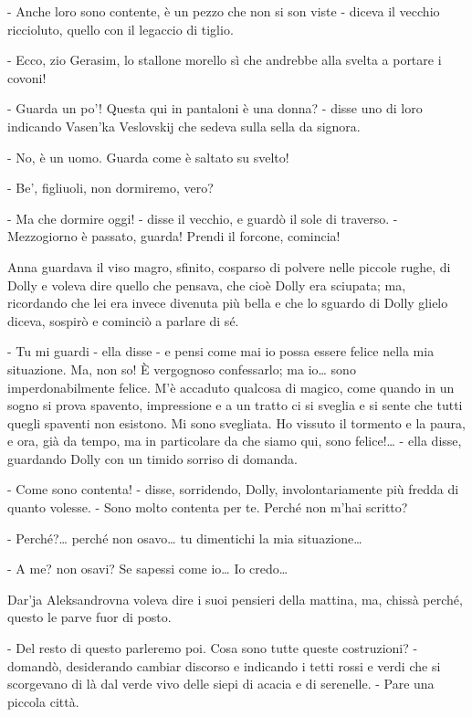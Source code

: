 - Anche loro sono contente, è un pezzo che non si son viste - diceva il vecchio riccioluto, quello con il legaccio di tiglio. 

- Ecco, zio Gerasim, lo stallone morello sì che andrebbe alla svelta a portare i covoni! 

- Guarda un po'! Questa qui in pantaloni è una donna? - disse uno di loro indicando Vasen'ka Veslovskij che sedeva sulla sella da signora. 

- No, è un uomo. Guarda come è saltato su svelto! 

- Be', figliuoli, non dormiremo, vero? 

- Ma che dormire oggi! - disse il vecchio, e guardò il sole di traverso. - Mezzogiorno è passato, guarda! Prendi il forcone, comincia! 

\label{xviii-5} 

Anna guardava il viso magro, sfinito, cosparso di polvere nelle piccole rughe, di Dolly e voleva dire quello che pensava, che cioè Dolly era sciupata; ma, ricordando che lei era invece divenuta più bella e che lo sguardo di Dolly glielo diceva, sospirò e cominciò a parlare di sé. 

- Tu mi guardi - ella disse - e pensi come mai io possa essere felice nella mia situazione. Ma, non so! È vergognoso confessarlo; ma io\ldots{} sono imperdonabilmente felice. M'è accaduto qualcosa di magico, come quando in un sogno si prova spavento, impressione e a un tratto ci si sveglia e si sente che tutti quegli spaventi non esistono. Mi sono svegliata. Ho vissuto il tormento e la paura, e ora, già da tempo, ma in particolare da che siamo qui, sono felice!\ldots{} - ella disse, guardando Dolly con un timido sorriso di domanda. 

- Come sono contenta! - disse, sorridendo, Dolly, involontariamente più fredda di quanto volesse. - Sono molto contenta per te. Perché non m'hai scritto? 

- Perché?\ldots{} perché non osavo\ldots{} tu dimentichi la mia situazione\ldots{} 

- A me? non osavi? Se sapessi come io\ldots{} Io credo\ldots{} 

Dar'ja Aleksandrovna voleva dire i suoi pensieri della mattina, ma, chissà perché, questo le parve fuor di posto. 

- Del resto di questo parleremo poi. Cosa sono tutte queste costruzioni? - domandò, desiderando cambiar discorso e indicando i tetti rossi e verdi che si scorgevano di là dal verde vivo delle siepi di acacia e di serenelle. - Pare una piccola città. 

